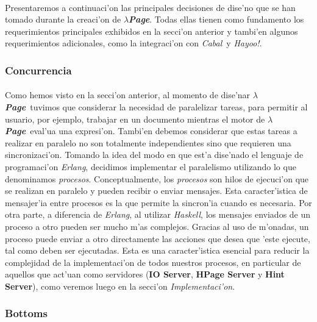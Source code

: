 \documentclass[a4paper]{article}
\newcommand{\haskell}{\textsl{Haskell}}
\newcommand{\hpage}{\textbf{\textsl{$\lambda$Page}}}
\newcommand{\cabal}{\textsl{Cabal}}
\begin{document}
\paragraph{}Presentaremos a continuaci'on las principales decisiones de dise'no que se han tomado durante la creaci'on de \hpage.  Todas ellas tienen como fundamento los requerimientos principales exhibidos en la secci'on anterior y tambi'en algunos requerimientos adicionales, como la integraci'on con \cabal\ y \textsl{Hayoo!}.
\subsubsection{Concurrencia}
\paragraph{}Como hemos visto en la secci'on anterior, al momento de dise'nar \hpage\ tuvimos que considerar la necesidad de paralelizar tareas, para permitir al usuario, por ejemplo, trabajar en un documento mientras el motor de \hpage\ eval'ua una expresi'on.  Tambi'en debemos considerar que estas tareas a realizar en paralelo no son totalmente independientes sino que requieren una sincronizaci'on.  Tomando la idea del modo en que est'a dise'nado el lenguaje de programaci'on \textsl{Erlang}, decidimos implementar el paralelismo utilizando lo que denominamos \textsl{procesos}.  Conceptualmente, los \textsl{procesos} son hilos de ejecuci'on que se realizan en paralelo y pueden recibir o enviar mensajes.   Esta caracter'istica de mensajer'ia entre procesos es la que permite la sincron'ia cuando es necesaria.  Por otra parte, a diferencia de \textsl{Erlang}, al utilizar \haskell, los mensajes enviados de un proceso a otro pueden ser mucho m'as complejos.  Gracias al uso de m'onadas, un proceso puede enviar a otro directamente las acciones que desea que 'este ejecute, tal como deben ser ejecutadas.  Esta es una caracter'istica esencial para reducir la complejidad de la implementaci'on de todos nuestros procesos, en particular de aquellos que act'uan como servidores (\textbf{IO Server}, \textbf{HPage Server} y \textbf{Hint Server}), como veremos luego en la secci'on \textsl{Implementaci'on}.
\subsubsection{Bottoms}
\end{document}
